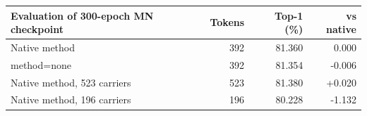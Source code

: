 \begin{tabular}{lrrr}
\toprule
Evaluation of 300-epoch MN checkpoint & Tokens & Top-1 (\%) & vs native \\
\midrule
Native method & 392 & 81.360 & 0.000 \\
method=none & 392 & 81.354 & -0.006 \\
Native method, 523 carriers & 523 & 81.380 & +0.020 \\
Native method, 196 carriers & 196 & 80.228 & -1.132 \\
\bottomrule
\end{tabular}
